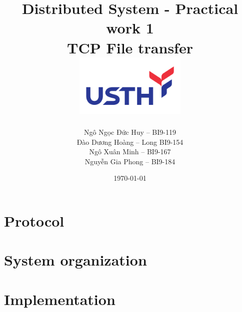 \documentclass{article}
\begin{document}
\begin{titlepage}
	\title{
		\Large{Distributed System - Practical work 1} \\
		\Huge{\textbf{TCP File transfer}} \\
		\includegraphics[width=0.4\textwidth]{logo-usth-pa3-01.png}
	}
	\author{
		 Ngô Ngọc Đức Huy -- BI9-119 \\
		 Đào Dương Hoàng -- Long BI9-154 \\
		 Ngô Xuân Minh -- BI9-167 \\
		 Nguyễn Gia Phong -- BI9-184
	}
	\date{\today}
\end{titlepage}

\maketitle

\section{Protocol}



\section{System organization}
\section{Implementation}
\end{document}

